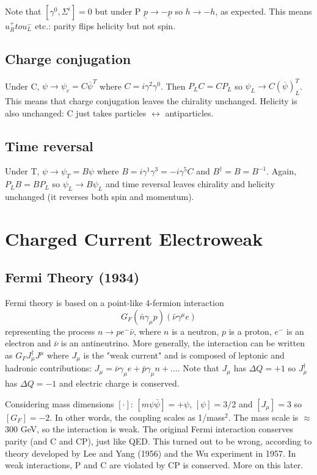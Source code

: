 \documentclass[a4paper,12pt]{article}
\begin{document}
Note that $[\gamma^0, \Sigma^i] = 0$ but under P $\underline{p} \to - \underline{p}$ so $h \to -h$, as expected. This means $u_R^+ to u_L^-$ etc.: parity flips helicity but not spin.
%
\subsection{Charge conjugation}
%
Under C, $\psi \to \psi_c = C\overline{\psi}^T$ where $C = i\gamma^2\gamma^0$. Then $P_LC = CP_L$ so $\psi_L \to C(\overline{\psi})_L^T$. 
This means that charge conjugation leaves the chirality unchanged. Helicity is also unchanged: C just takes particles $\leftrightarrow$ antiparticles.
%
\subsection{Time reversal}
%
Under T, $\psi \to \psi_T = B\psi$ where $B = i\gamma^1\gamma^3 = -i\gamma^5C$ and $B^\dagger = B = B^{-1}$. Again, $P_LB = BP_L$ so $\psi_L \to B\psi_L$ and time reversal leaves chirality and helicity unchanged (it reverses both spin and momentum). 
%
%
\section{Charged Current Electroweak}
%
\subsection{Fermi Theory (1934)}
%
Fermi theory is based on a point-like 4-fermion interaction
\begin{equation}
    G_F(\bar{n}\gamma_\mu p)(\bar{\nu}\gamma^\mu e)
\end{equation}
representing the process $n \to pe^-\bar{\nu}$, where $n$ is a neutron, $p$ is a proton, $e^-$ is an electron and $\bar{\nu}$ is an antineutrino. More generally, the interaction can be written as $G_F J_\mu^\dagger J^\mu$ where $J_\mu$ is the "weak current" and is composed of leptonic and hadronic contributions: $J_\mu = \bar{\nu}\gamma_\mu e + \bar{p}\gamma_\mu n + ...$. Note that $J_\mu$ has $\Delta Q = +1$ so $J_\mu^\dagger$ has $\Delta Q = -1$ and electric charge is conserved. 

Considering mass dimensions $[\cdot]$: $[m\psi\bar{\psi}]=+\psi$, $[\psi]=3/2$ and $[J_\mu] =3$ so $[G_F]=-2$. In other words, the coupling scales as 1/mass$^2$. The mass scale is $\approx$ 300 GeV, so the interaction is weak. The original Fermi interaction conserves parity (and C and CP), just like QED. This turned out to be wrong, according to theory developed by Lee and Yang (1956) and the Wu experiment in 1957. In weak interactions, P and C are violated by CP is conserved. More on this later.
%
\end{document}
